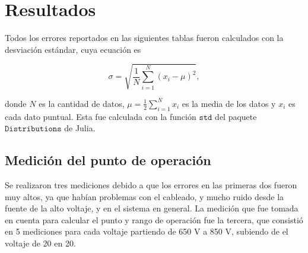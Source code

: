\documentclass[a4paper,10pt]{article}
\numberwithin{equation}{section}
\begin{document}
\section{Resultados}
\label{s:resultados}

Todos los errores reportados en las siguientes tablas fueron calculados con la desviación 
estándar, cuya ecuación es 

\begin{equation}
 \sigma = \sqrt{\frac{1}{N}\sum_{i=1}^N (x_i - \mu)^2},
\end{equation}

donde $N$ es la cantidad de datos, $\mu = \frac{1}{2} \sum_{i=1}^N x_i$ es la 
media de los datos y $x_i$ es cada dato puntual. Esta fue calculada con la 
función \href{http://distributionsjl.readthedocs.org/en/latest/univariate.html?highlight=std\#std}{$\texttt{std}$} 
del paquete $\texttt{Distributions}$ de Julia.


\subsection{Medición del punto de operación}

Se realizaron tres mediciones debido a que los errores en las primeras dos fueron muy altos, 
ya que habían problemas con el cableado, y mucho ruido desde la fuente de la alto voltaje,
y en el sistema en general. La medición que fue tomada en cuenta para calcular el 
punto y rango de operación fue la tercera, que consistió en 5 mediciones para cada voltaje 
partiendo de 650 V a 850 V, subiendo de el voltaje de 20 en 20. 


\begin{table}[H]
\centering
\caption{Mediciones a distintos voltajes para el flujo de muones}
\end{table}
\end{document}

